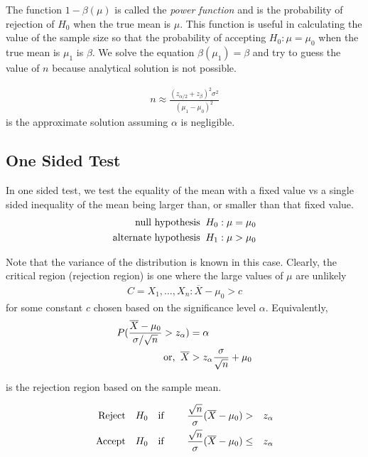 \documentclass[../probability-notes.tex]{subfiles}
\begin{document}
    The function $1 - \beta(\mu)$ is called the \emph{power function} and is the probability of rejection of $H_{0}$ when the true mean is $\mu$. This function is useful in calculating the value of the sample size so that the probability of accepting $H_{0}: \mu = \mu_{0}$ when the true mean is $\mu_{1}$ is $\beta$. We solve the equation $\beta(\mu_{1}) = \beta$ and try to guess the value of $n$ because analytical solution is not possible.

    \begin{align*}
         n \approx \frac{(z_{\alpha/2} + z_{\beta})^{2} \sigma^{2}}{(\mu_{1} - \mu_{0})^{2}}
    \end{align*}
    is the approximate solution assuming $\alpha$ is negligible.


    \subsection{One Sided Test}
    In one sided test, we test the equality of the mean with a fixed value vs a single sided inequality of the mean being larger than, or smaller than that fixed value.
    \begin{align*}
        \text{null hypothesis \:} H_{0}&: \mu = \mu_{0}\\
        \text{alternate hypothesis \:} H_{1}&: \mu > \mu_{0}
    \end{align*}

    Note that the variance of the distribution is known in this case. Clearly, the critical region (rejection region) is one where the large values of $\mu$ are unlikely
    \begin{align*}
        C = {X_{1}, \ldots, X_{n}: \overline{X} - \mu_{0} > c}
    \end{align*}
    for some constant $c$ chosen based on the significance level $\alpha$. Equivalently,
    \begin{align*}
        P(\frac{\overline{X} - \mu_{0}}{\sigma/\sqrt{n}} > z_{\alpha}) &= \alpha\\
        \text{or, \:} \overline{X} &> z_{\alpha}\frac{\sigma}{\sqrt{n}} + \mu_{0}
    \end{align*}

    is the rejection region based on the sample mean.

    \begin{alignat*}{4}
        \text{Reject\quad} &H_{0} \text{\quad if \quad} &\frac{\sqrt{n}}{\sigma}(\overline{X} - \mu_{0}) &> &z_{\alpha}\\
        \text{Accept\quad} &H_{0} \text{\quad if\quad} &\frac{\sqrt{n}}{\sigma}(\overline{X} - \mu_{0}) &\leq &z_{\alpha}\\
    \end{alignat*}
\end{document}
